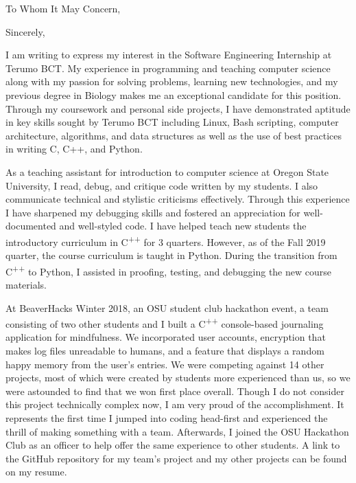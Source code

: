 \documentclass[11pt,a4paper,roman]{moderncv}        %
\begin{document}
\date{October 21, 2019}
\opening{To Whom It May Concern,}
\closing{Sincerely,}
\makelettertitle

I am writing to express my interest in the Software Engineering Internship at Terumo BCT. My experience in programming and teaching computer science along with my passion for solving problems, learning new technologies, and my previous degree in Biology makes me an exceptional candidate for this position. Through my coursework and personal side projects, I have demonstrated aptitude in key skills sought by Terumo BCT including Linux, Bash scripting, computer architecture, algorithms, and data structures as well as the use of best practices in writing C, C++, and Python. 
 
As a teaching assistant for introduction to computer science at Oregon State University, I read, debug, and critique code written by my students. I also communicate technical and stylistic criticisms effectively. Through this experience I have sharpened my debugging skills and fostered an appreciation for well-documented and well-styled code. I have helped teach new students the introductory curriculum in C\textsuperscript{++} for 3 quarters. However, as of the Fall 2019 quarter, the course curriculum is taught in Python. During the transition from C\textsuperscript{++} to Python, I assisted in proofing, testing, and debugging the new course materials.
 
At BeaverHacks Winter 2018, an OSU student club hackathon event, a team consisting of two other students and I built a C\textsuperscript{++} console-based journaling application for mindfulness. We incorporated user accounts, encryption that makes log files unreadable to humans, and a feature that displays a random happy memory from the user's entries. We were competing against 14 other projects, most of which were created by students more experienced than us, so we were astounded to find that we won first place overall. Though I do not consider this project technically complex now, I am very proud of the accomplishment. It represents the first time I jumped into coding head-first and experienced the thrill of making something with a team. Afterwards, I joined the OSU Hackathon Club as an officer to help offer the same experience to other students. A link to the GitHub repository for my team's project and my other projects can be found on my resume.
 
\end{document}
